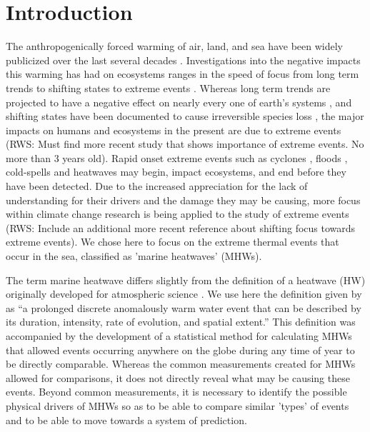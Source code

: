 \documentclass[a4paper,10pt,review]{elsarticle}
\begin{document}
\section{Introduction}
The anthropogenically forced warming of air, land, and sea have been widely publicized over the last several decades \citep[e.g.]{Manabe1967, Sawyer1972, Hansen1981, Cox2000, Rosenzweig2008}. Investigations into the negative impacts this warming has had on ecosystems ranges in the speed of focus from long term trends \citep[e.g.]{} to shifting states \citep[e.g.]{Travis2003} to extreme events \citep[e.g.]{Easterling2000}. Whereas long term trends are projected to have a negative effect on nearly every one of earth's systems \citep{IPCC2014}, and shifting states have been documented to cause irreversible species loss \citep{Thomas2004}, the major impacts on humans and ecosystems in the present are due to extreme events \citep{Easterling2000} (RWS: Must find more recent study that shows importance of extreme events. No more than 3 years old). Rapid onset extreme events such as cyclones \citep[e.g.]{}, floods \citep[e.g.]{}, cold-spells \citep[e.g.]{Gunter1941, Lirman2011} and heatwaves \citep[e.g.]{Garrabou2009} may begin, impact ecosystems, and end before they have been detected. Due to the increased appreciation for the lack of understanding for their drivers and the damage they may be causing, more focus within climate change research is being applied to the study of extreme events \citep{Jentsch2007}(RWS: Include an additional more recent reference about shifting focus towards extreme events). We chose here to focus on the extreme thermal events that occur in the sea, classified as 'marine heatwaves' (MHWs).

The term marine heatwave differs slightly from the definition of a heatwave (HW) originally developed for atmospheric science \citep{Perkins2013}. We use here the definition given by \citet{Hobday2016} as ``a prolonged discrete anomalously warm water event that can be described by its duration, intensity, rate of evolution, and spatial extent.'' This definition was accompanied by the development of a statistical method for calculating MHWs that allowed events occurring anywhere on the globe during any time of year to be directly comparable. Whereas the common measurements created for MHWs allowed for comparisons, it does not directly reveal what may be causing these events. Beyond common measurements, it is necessary to identify the possible physical drivers of MHWs so as to be able to compare similar 'types' of events and to be able to move towards a system of prediction. 
\end{document}
